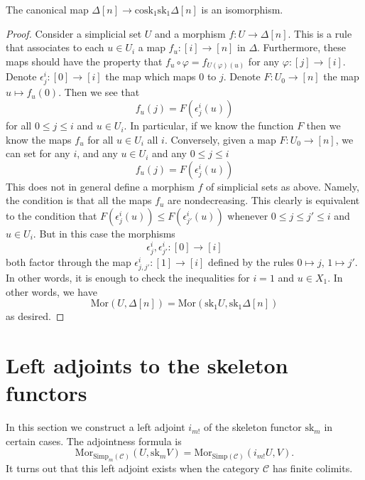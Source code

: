 \begin{lemma}
\label{lemma-simplex-cosk}
The canonical map
$\Delta[n] \to \text{cosk}_1 \text{sk}_1 \Delta[n]$
is an isomorphism.
\end{lemma}

\begin{proof}
Consider a simplicial set $U$ and a morphism
$f : U \to \Delta[n]$. This is a rule that associates
to each $u \in U_i$ a map $f_u : [i] \to [n]$ in $\Delta$.
Furthermore, these maps should have the property that
$f_u \circ \varphi = f_{U(\varphi)(u)}$ for any 
$\varphi : [j] \to [i]$. Denote $\epsilon^i_j : [0] \to [i]$
the map which maps $0$ to $j$. Denote $F : U_0 \to [n]$
the map $u \mapsto f_u(0)$. Then we see that
$$
f_u(j) = F(\epsilon^i_j(u))
$$
for all $0 \leq j \leq i$ and $u \in U_i$.
In particular, if we know the function $F$
then we know the maps $f_u$ for all $u\in U_i$ all $i$.
Conversely, given a map $F : U_0 \to [n]$,
we can set for any $i$, and any $u \in U_i$ 
and any $0 \leq j \leq i$
$$
f_u(j) = F(\epsilon^i_j(u))
$$
This does not in general define a morphism $f$ of simplicial sets
as above. Namely, the condition is that all the maps $f_u$ are
nondecreasing. This clearly is equivalent to the condition
that $F(\epsilon^i_j(u)) \leq F(\epsilon^i_{j'}(u))$
whenever $0 \leq j \leq j' \leq i$ and $u \in U_i$. But in this
case the morphisms
$$
\epsilon^i_j, \epsilon^i_{j'} : [0] \to [i]
$$
both factor through the map
$\epsilon^i_{j, j'} : [1] \to [i]$ defined by the rules
$0 \mapsto j$, $1 \mapsto j'$.
In other words, it is enough to check the inequalities for
$i = 1$ and $u \in X_1$. In other words, we have
$$
\text{Mor}(U, \Delta[n])
=
\text{Mor}(\text{sk}_1 U, \text{sk}_1 \Delta[n])
$$
as desired.
\end{proof}








\section{Left adjoints to the skeleton functors}
\label{section-adjoint-left}

\noindent
In this section we construct a left adjoint $i_{m!}$
of the skeleton functor $\text{sk}_m$ in certain cases.
The adjointness formula is
$$
\text{Mor}_{\text{Simp}_m(\mathcal{C})}(U,\text{sk}_mV)
=
\text{Mor}_{\text{Simp}(\mathcal{C})}(i_{m!}U,V).
$$
It turns out that this left adjoint exists when
the category $\mathcal{C}$ has finite colimits.

